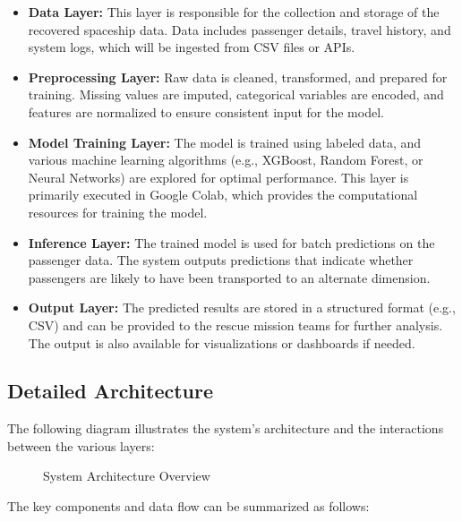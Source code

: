 \documentclass[15pt]{article}
\begin{document}
\begin{itemize}
    \item \textbf{Data Layer:} This layer is responsible for the collection and storage of the recovered spaceship data. Data includes passenger details, travel history, and system logs, which will be ingested from CSV files or APIs.
    \item \textbf{Preprocessing Layer:} Raw data is cleaned, transformed, and prepared for training. Missing values are imputed, categorical variables are encoded, and features are normalized to ensure consistent input for the model.
    \item \textbf{Model Training Layer:} The model is trained using labeled data, and various machine learning algorithms (e.g., XGBoost, Random Forest, or Neural Networks) are explored for optimal performance. This layer is primarily executed in Google Colab, which provides the computational resources for training the model.
    \item \textbf{Inference Layer:} The trained model is used for batch predictions on the passenger data. The system outputs predictions that indicate whether passengers are likely to have been transported to an alternate dimension.
    \item \textbf{Output Layer:} The predicted results are stored in a structured format (e.g., CSV) and can be provided to the rescue mission teams for further analysis. The output is also available for visualizations or dashboards if needed.
\end{itemize}

\subsection{Detailed Architecture}

The following diagram illustrates the system's architecture and the interactions between the various layers:

\begin{figure}[h!]
    \centering
    \caption{System Architecture Overview}
    \label{fig:architecture}
\end{figure}

The key components and data flow can be summarized as follows:
\end{document}
